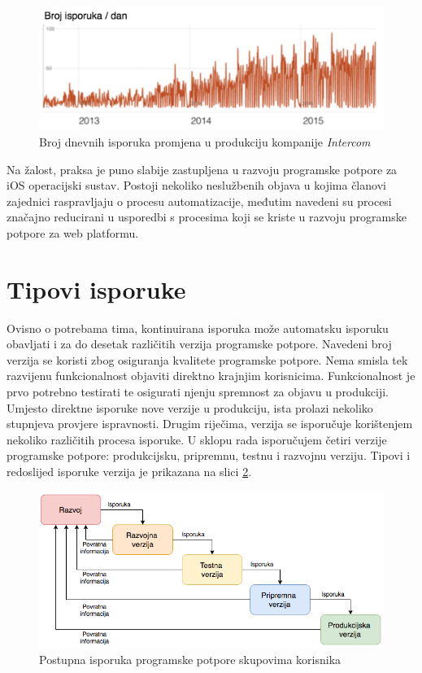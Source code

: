 \documentclass[times, utf8, diplomski, numeric]{fer}
\begin{document}
\begin{figure}
\centering
\includegraphics[scale=0.7]{IntercomShipsPerDay}
\caption{Broj dnevnih isporuka promjena u produkciju kompanije \textit{Intercom}}
\label{fig:IntercomShipsPerDay}
\end{figure}

Na žalost, praksa je puno slabije zastupljena u razvoju programske potpore za iOS operacijski sustav. Postoji nekoliko neslužbenih objava u kojima članovi zajednici raspravljaju o procesu automatizacije, međutim navedeni su procesi značajno reducirani u usporedbi s procesima koji se kriste u razvoju programske potpore za web platformu.

\section{Tipovi isporuke}

Ovisno o potrebama tima, kontinuirana isporuka može automatsku isporuku obavljati i za do desetak različitih verzija programske potpore. Navedeni broj verzija se koristi zbog osiguranja kvalitete programske potpore. Nema smisla tek razvijenu funkcionalnost objaviti direktno krajnjim korisnicima. Funkcionalnost je prvo potrebno testirati te osigurati njenju spremnost za objavu u produkciji. Umjesto direktne isporuke nove verzije u produkciju, ista prolazi nekoliko stupnjeva provjere ispravnosti. Drugim riječima, verzija se isporučuje korištenjem nekoliko različitih procesa isporuke. U sklopu rada isporučujem četiri verzije programske potpore: produkcijsku, pripremnu, testnu i razvojnu verziju. Tipovi i redoslijed isporuke verzija je prikazana na slici \ref{fig:DeploymentStages}.

\begin{figure}[h]
\centering
\includegraphics[scale=0.6]{DeploymentStages}
\caption{Postupna isporuka programske potpore skupovima korisnika}
\label{fig:DeploymentStages}
\end{figure}
\end{document}
